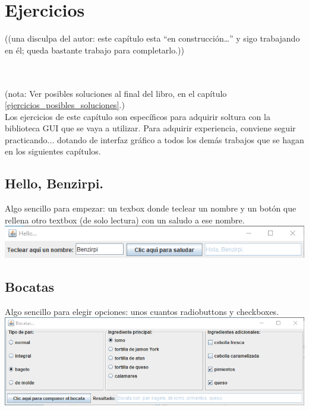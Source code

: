 \documentclass[spanish,12pt,a4paper,final,oneside]{book}
\begin{document}
\chapter{Ejercicios}\label{ejercicios_gui}

\begin{footnotesize}((una disculpa del autor: este capítulo esta ``en construcción\ldots'' y sigo trabajando en él; queda bastante trabajo para completarlo.))\end{footnotesize}
\\
\\

(nota: Ver posibles soluciones al final del libro, en el capítulo \ref{ejercicios_posibles_soluciones}.)\\

Los ejercicios de este capítulo son específicos para adquirir soltura con la biblioteca GUI que se vaya a utilizar. Para adquirir experiencia, conviene seguir practicando... dotando de interfaz gráfico a todos los demás trabajos que se hagan en los siguientes capítulos.


\section{Hello, Benzirpi.}\label{ejercicio_hellobenzirpi}
Algo sencillo para empezar: un texbox donde teclear un nombre y un botón que rellena otro textbox (de solo lectura) con un saludo a ese nombre.
\\ \includegraphics[width=\textwidth]{HelloBenzirpi - pantallazo - Java}

\section{Bocatas}\label{ejercicio_bocatas}
Algo sencillo para elegir opciones: unos cuantos radiobuttons y checkboxes.
\\ \includegraphics[width=\textwidth]{Bocatas - pantallazo - Java}
\end{document}
